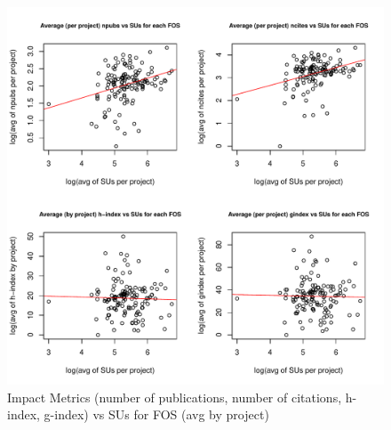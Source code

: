 \documentclass{tex/sig-alternate}
\begin{document}
\begin{figure}[!htb] 
  \centering 
    \includegraphics[width=1.0\columnwidth]{images/08_metrics_vs_alloc_avg_log_fit.pdf} 
  \caption{Impact Metrics (number of publications, number of citations, h-index, g-index) vs SUs for FOS (avg by project)}\label{F:metrics-vs-alloc-avg-log-fit} 
\end{figure} 
 
\end{document}
